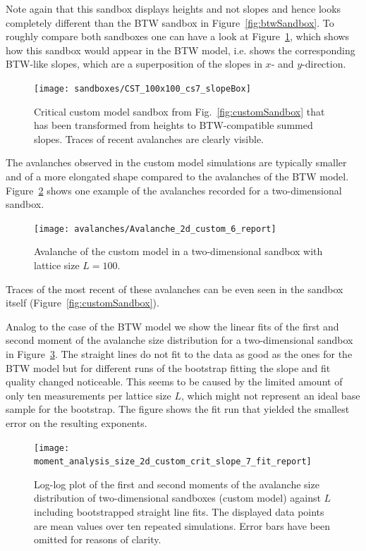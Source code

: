 Note again that this sandbox displays heights and not slopes and hence looks completely different than the BTW sandbox
in Figure~\ref{fig:btwSandbox}. To roughly compare both sandboxes one can have a look at Figure~\ref{fig:cstSlopebox},
which shows how this sandbox would appear in the BTW model, i.e. shows the corresponding BTW-like slopes, which are
a superposition of the slopes in $x$- and $y$-direction.
\begin{figure}[htb]
    \centering
    \texttt{[image: sandboxes/CST\_100x100\_cs7\_slopeBox]}
    \caption{Critical custom model sandbox from Fig.~\ref{fig:customSandbox} that has been transformed from heights to
             BTW-compatible summed slopes. Traces of recent avalanches are clearly visible.}
    \label{fig:cstSlopebox}
\end{figure}

The avalanches observed in the custom model simulations are typically smaller and of a more elongated shape compared
to the avalanches of the BTW model. Figure~\ref{fig:custom2DAvalanche} shows one example of the avalanches recorded
for a two-dimensional sandbox.
\begin{figure}[htb]
    \centering
    \texttt{[image: avalanches/Avalanche\_2d\_custom\_6\_report]}
    \caption{Avalanche of the custom model in a two-dimensional sandbox with lattice size $L=100$.}
    \label{fig:custom2DAvalanche}
\end{figure}
Traces of the most recent of these avalanches can be even seen in the sandbox itself (Figure~\ref{fig:customSandbox}).

Analog to the case of the BTW model we show the linear fits of the first and second moment of the avalanche size
distribution for a two-dimensional sandbox in Figure~\ref{fig:customSizeFit}.
The straight lines do not fit to the data as good as the ones for the BTW model but for different runs of the
bootstrap fitting the slope and fit quality changed noticeable. This seems to be caused by the limited amount of only
ten measurements per lattice size $L$, which might not represent an ideal base sample for the bootstrap.
The figure shows the fit run that yielded the smallest error on the resulting exponents.
\begin{figure}[htb]
    \centering
    \texttt{[image: moment\_analysis\_size\_2d\_custom\_crit\_slope\_7\_fit\_report]}
    \caption{Log-log plot of the first and second moments of the avalanche size distribution of two-dimensional
             sandboxes (custom model) against $L$ including bootstrapped straight line fits.
             The displayed data points are mean values over ten repeated simulations.
             Error bars have been omitted for reasons of clarity.}
    \label{fig:customSizeFit}
\end{figure}

